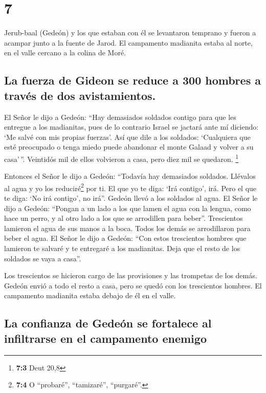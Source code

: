 \hypertarget{section-6}{%
\section{7}\label{section-6}}

 Jerub-baal (Gedeón) y los que estaban con él se
levantaron temprano y fueron a acampar junto a la fuente de Jarod. El
campamento madianita estaba al norte, en el valle cercano a la colina de
Moré.

\hypertarget{la-fuerza-de-gideon-se-reduce-a-300-hombres-a-travuxe9s-de-dos-avistamientos.}{%
\subsection{La fuerza de Gideon se reduce a 300 hombres a través de dos
avistamientos.}\label{la-fuerza-de-gideon-se-reduce-a-300-hombres-a-travuxe9s-de-dos-avistamientos.}}

 El Señor le dijo a Gedeón: ``Hay demasiados soldados
contigo para que les entregue a los madianitas, pues de lo contrario
Israel se jactará ante mí diciendo: `Me salvé con mis propias fuerzas'.
 Así que dile a los soldados: `Cualquiera que esté
preocupado o tenga miedo puede abandonar el monte Galaad y volver a su
casa'\,''. Veintidós mil de ellos volvieron a casa, pero diez mil se
quedaron. \footnote{\textbf{7:3} Deut 20,8}

 Entonces el Señor le dijo a Gedeón: ``Todavía hay
demasiados soldados. Llévalos al agua y yo los reduciré\footnote{\textbf{7:4}
  O ``probaré'', ``tamizaré'', ``purgaré''.} por ti. El que yo te diga:
`Irá contigo', irá. Pero el que te diga: `No irá contigo', no irá''.
 Gedeón llevó a los soldados al agua. El Señor le dijo a
Gedeón: ``Pongan a un lado a los que lamen el agua con la lengua, como
hace un perro, y al otro lado a los que se arrodillen para beber''.
 Trescientos lamieron el agua de sus manos a la boca.
Todos los demás se arrodillaron para beber el agua.  El
Señor le dijo a Gedeón: ``Con estos trescientos hombres que lamieron te
salvaré y te entregaré a los madianitas. Deja que el resto de los
soldados se vaya a casa''.

 Los trescientos se hicieron cargo de las provisiones y
las trompetas de los demás. Gedeón envió a todo el resto a casa, pero se
quedó con los trescientos hombres. El campamento madianita estaba debajo
de él en el valle.

\hypertarget{la-confianza-de-gedeuxf3n-se-fortalece-al-infiltrarse-en-el-campamento-enemigo}{%
\subsection{La confianza de Gedeón se fortalece al infiltrarse en el
campamento
enemigo}\label{la-confianza-de-gedeuxf3n-se-fortalece-al-infiltrarse-en-el-campamento-enemigo}}

